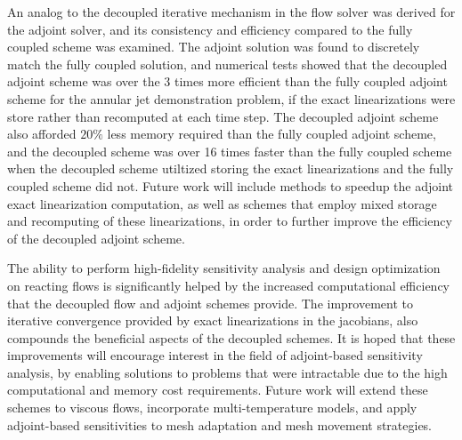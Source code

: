 An analog to the decoupled iterative mechanism in the flow solver was derived
for the adjoint solver, and its consistency and efficiency compared to the fully
coupled scheme was examined.  The adjoint solution was found to discretely match
the fully coupled solution, and numerical tests showed that the decoupled
adjoint scheme was over the 3 times more efficient than the fully coupled
adjoint scheme for the annular jet demonstration problem, if the exact
linearizations were store rather than recomputed at each time step.  The
decoupled adjoint scheme also afforded $20\%$ less memory required than the
fully coupled adjoint scheme, and the decoupled scheme was over 16 times faster
than the fully coupled scheme when the decoupled scheme utiltized storing the
exact linearizations and the fully coupled scheme did not.  Future work will
include methods to speedup the adjoint exact linearization computation, as well
as schemes that employ mixed storage and recomputing of these linearizations,
in order to further improve the efficiency of the decoupled adjoint scheme.

The ability to perform high-fidelity sensitivity analysis and design
optimization on reacting flows is significantly helped by the increased
computational efficiency that the decoupled flow and adjoint schemes provide.
The improvement to iterative convergence provided by exact linearizations in the
jacobians, also compounds the beneficial aspects of the decoupled schemes.  It
is hoped that these improvements will encourage interest in the field of
adjoint-based sensitivity analysis, by enabling solutions to problems that were
intractable due to the high computational and memory cost requirements.
Future work will extend these schemes to viscous flows, incorporate
multi-temperature models, and apply adjoint-based sensitivities to mesh
adaptation and mesh movement strategies.

